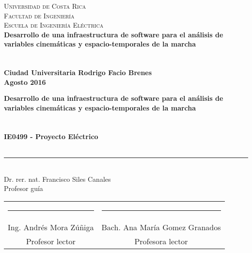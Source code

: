 \documentclass[11pt, letterpaper, twoside, openright]{book}
\begin{document}
\frontmatter
\pagestyle{plain}

\thispagestyle{empty}
\begin{center}
     \Large\textsc{Universidad de Costa Rica \\ Facultad de Ingeniería \\ Escuela de Ingeniería Eléctrica} \\
    \vspace{6cm}
    \LARGE\bfseries{Desarrollo de una infraestructura de software para el análisis de variables cinemáticas y espacio-temporales de la marcha} \\
    \vspace{2cm}
    \large{} \\
    \vspace{0.5cm}
    \Large{} \\
    \vfill
    \large{Ciudad Universitaria Rodrigo Facio Brenes}\\
    \vspace{0.5cm}
    \large{Agosto 2016}
\end{center}
\newpage\null\thispagestyle{empty}\newpage

\thispagestyle{empty}
\begin{center}
    \LARGE\bfseries{Desarrollo de una infraestructura de software para el análisis de variables cinemáticas y espacio-temporales de la marcha} \\
    \vspace{2cm}
    \large{} \\
    \vspace{0.5cm}
    \Large{} \\
    \vfill
    \large\bfseries{IE0499 - Proyecto Eléctrico} \\
    \vspace{0.5cm}
    \large{} \\
    \vspace{4cm}
    \rule{6cm}{0.1pt}\\
    \normalfont\large{Dr. rer. nat. Francisco Siles Canales} \\
    \normalfont\large{Profesor guía} \\
    \vspace{2cm} 
    \begin{table}[!h]
        \centering
        \begin{tabular}{cc}
            \rule{6cm}{0.1pt}  & \rule{6cm}{0.1pt} \\
            Ing. Andrés Mora Zúñiga & Bach. Ana María Gomez Granados \\
            Profesor lector         & Profesora lector \\
        \end{tabular}
    \end{table}
\end{center}
\end{document}
